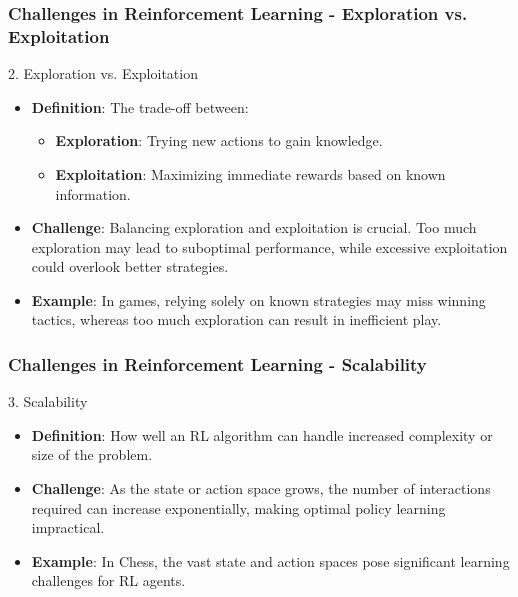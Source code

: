 \documentclass[aspectratio=169]{beamer}
\begin{document}
\begin{frame}[fragile]
    \frametitle{Challenges in Reinforcement Learning - Exploration vs. Exploitation}
    \begin{block}{2. Exploration vs. Exploitation}
        \begin{itemize}
            \item \textbf{Definition}: The trade-off between:
            \begin{itemize}
                \item \textbf{Exploration}: Trying new actions to gain knowledge.
                \item \textbf{Exploitation}: Maximizing immediate rewards based on known information.
            \end{itemize}
            \item \textbf{Challenge}: Balancing exploration and exploitation is crucial. Too much exploration may lead to suboptimal performance, while excessive exploitation could overlook better strategies.
            \item \textbf{Example}: In games, relying solely on known strategies may miss winning tactics, whereas too much exploration can result in inefficient play.
        \end{itemize}
    \end{block}
\end{frame}

\begin{frame}[fragile]
    \frametitle{Challenges in Reinforcement Learning - Scalability}
    \begin{block}{3. Scalability}
        \begin{itemize}
            \item \textbf{Definition}: How well an RL algorithm can handle increased complexity or size of the problem.
            \item \textbf{Challenge}: As the state or action space grows, the number of interactions required can increase exponentially, making optimal policy learning impractical.
            \item \textbf{Example}: In Chess, the vast state and action spaces pose significant learning challenges for RL agents.
        \end{itemize}
    \end{block}
\end{frame}
\end{document}
